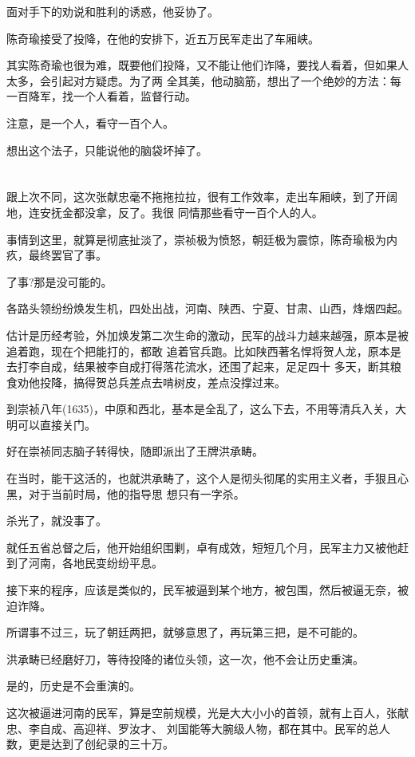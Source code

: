 \documentclass[11pt,a4paper,onecolumn]{article}
\begin{document}
面对手下的劝说和胜利的诱惑，他妥协了。

陈奇瑜接受了投降，在他的安排下，近五万民军走出了车厢峡。

其实陈奇瑜也很为难，既要他们投降，又不能让他们诈降，要找人看着，但如果人太多，会引起对方疑虑。为了两
全其美，他动脑筋，想出了一个绝妙的方法：每一百降军，找一个人看着，监督行动。

注意，是一个人，看守一百个人。

想出这个法子，只能说他的脑袋坏掉了。

\section[\thesection]{}

跟上次不同，这次张献忠毫不拖拖拉拉，很有工作效率，走出车厢峡，到了开阔地，连安抚金都没拿，反了。我很
同情那些看守一百个人的人。

事情到这里，就算是彻底扯淡了，崇祯极为愤怒，朝廷极为震惊，陈奇瑜极为内疚，最终罢官了事。

了事?那是没可能的。

各路头领纷纷焕发生机，四处出战，河南、陕西、宁夏、甘肃、山西，烽烟四起。

估计是历经考验，外加焕发第二次生命的激动，民军的战斗力越来越强，原本是被追着跑，现在个把能打的，都敢
追着官兵跑。比如陕西著名悍将贺人龙，原本是去打李自成，结果被李自成打得落花流水，还围了起来，足足四十
多天，断其粮食劝他投降，搞得贺总兵差点去啃树皮，差点没撑过来。

到崇祯八年(1635)，中原和西北，基本是全乱了，这么下去，不用等清兵入关，大明可以直接关门。

好在崇祯同志脑子转得快，随即派出了王牌\myrule 洪承畴。

在当时，能干这活的，也就洪承畴了，这个人是彻头彻尾的实用主义者，手狠且心黑，对于当前时局，他的指导思
想只有一字\myrule 杀。

杀光了，就没事了。

就任五省总督之后，他开始组织围剿，卓有成效，短短几个月，民军主力又被他赶到了河南，各地民变纷纷平息。

接下来的程序，应该是类似的，民军被逼到某个地方，被包围，然后被逼无奈，被迫诈降。

所谓事不过三，玩了朝廷两把，就够意思了，再玩第三把，是不可能的。

洪承畴已经磨好刀，等待投降的诸位头领，这一次，他不会让历史重演。

是的，历史是不会重演的。

这次被逼进河南的民军，算是空前规模，光是大大小小的首领，就有上百人，张献忠、李自成、高迎祥、罗汝才、
刘国能等大腕级人物，都在其中。民军的总人数，更是达到了创纪录的三十万。
\end{document}
